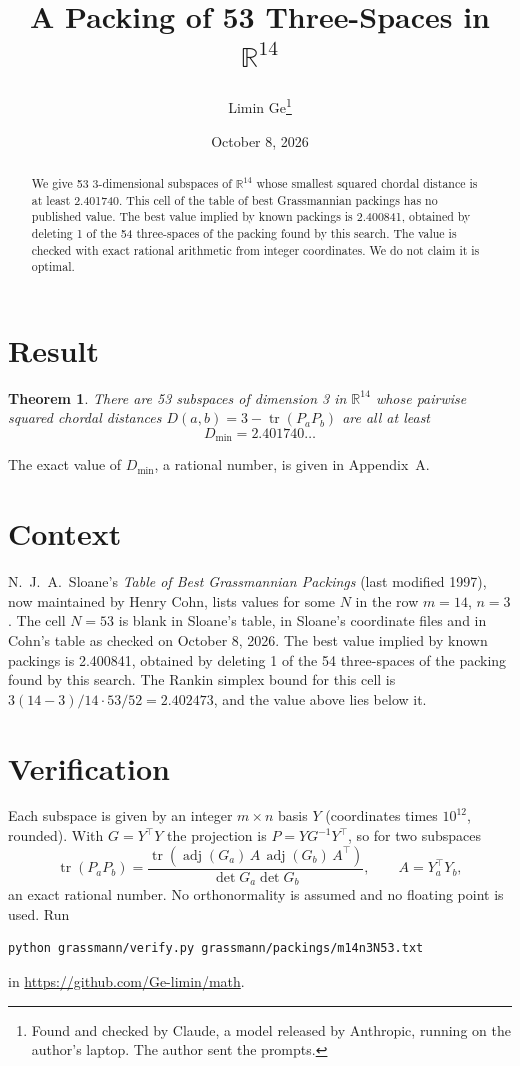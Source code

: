 \documentclass[11pt,a4paper]{article}
\title{A Packing of 53 Three-Spaces in $\mathbb{R}^{14}$}
\author{Limin Ge\thanks{Found and checked by Claude, a model released by Anthropic, running on the author's laptop. The author sent the prompts.}}
\date{October 8, 2026}
\newtheorem*{theorem}{Theorem}
\begin{document}
\maketitle
\begin{abstract}
We give 53 3-dimensional subspaces of $\mathbb{R}^{14}$ whose smallest squared chordal distance is at least 2.401740. This cell of the table of best Grassmannian packings has no published value. The best value implied by known packings is 2.400841, obtained by deleting 1 of the 54 three-spaces of the packing found by this search. The value is checked with exact rational arithmetic from integer coordinates. We do not claim it is optimal.
\end{abstract}

\section{Result}
\begin{theorem}
There are 53 subspaces of dimension 3 in $\mathbb{R}^{14}$ whose pairwise squared chordal distances $D(a,b) = 3 - \operatorname{tr}(P_aP_b)$ are all at least
\[ D_{\min} = 2.401740\ldots \]
\end{theorem}
The exact value of $D_{\min}$, a rational number, is given in Appendix~A.


\section{Context}
N.~J.~A.~Sloane's \emph{Table of Best Grassmannian Packings} (last modified 1997), now maintained by Henry Cohn, lists values for some $N$ in the row $m=14$, $n=3$. The cell $N=53$ is blank in Sloane's table, in Sloane's coordinate files and in Cohn's table as checked on October 8, 2026. The best value implied by known packings is 2.400841, obtained by deleting 1 of the 54 three-spaces of the packing found by this search. The Rankin simplex bound for this cell is $3(14-3)/14\cdot 53/52 = 2.402473$, and the value above lies below it.


\section{Verification}
Each subspace is given by an integer $m\times n$ basis $Y$ (coordinates times $10^{12}$, rounded). With $G=Y^\top Y$ the projection is $P=YG^{-1}Y^\top$, so for two subspaces
\[ \operatorname{tr}(P_aP_b)=\frac{\operatorname{tr}(\operatorname{adj}(G_a)\,A\,\operatorname{adj}(G_b)\,A^\top)}{\det G_a\det G_b},\qquad A=Y_a^\top Y_b, \]
an exact rational number. No orthonormality is assumed and no floating point is used. Run
\begin{verbatim}
python grassmann/verify.py grassmann/packings/m14n3N53.txt
\end{verbatim}
in \url{https://github.com/Ge-limin/math}.
\end{document}
